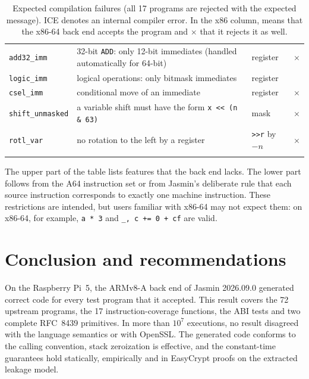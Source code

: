 \documentclass[11pt,a4paper]{article}
\newcommand{\yes}{\checkmark}
\newcommand{\no}{$\times$}
\newcommand{\ice}{ICE}
\begin{document}
\begin{longtable}{@{}p{2.9cm}p{8.1cm}p{2.4cm}c@{}}
\texttt{add32\_imm} & 32-bit \texttt{ADD}: only 12-bit immediates (handled automatically for 64-bit) & register & \no \\
\texttt{logic\_imm} & logical operations: only bitmask immediates & register & \yes \\
\texttt{csel\_imm} & conditional move of an immediate & register & \no \\
\texttt{shift\_unmasked} & a variable shift must have the form \texttt{x << (n \& 63)} & mask & \no \\
\texttt{rotl\_var} & no rotation to the left by a register & \texttt{>>r} by $-n$ & \no \\
\bottomrule
\caption{Expected compilation failures (all 17 programs are rejected with the
expected message). \ice{} denotes an internal compiler error. In the x86
column, \yes{} means that the x86-64 back end accepts the program and \no{}
that it rejects it as well.}
\end{longtable}

The upper part of the table lists features that the back end lacks. The
lower part follows from the A64 instruction set or from Jasmin's deliberate
rule that each source instruction corresponds to exactly one machine
instruction. These restrictions are intended, but users familiar with
x86-64 may not expect them: on x86-64, for example, \texttt{a * 3} and
\texttt{\_, c += 0 + cf} are valid.

\section{Conclusion and recommendations}

On the Raspberry Pi~5, the ARMv8-A back end of Jasmin 2026.09.0 generated
correct code for every test program that it accepted. This result covers the 72
upstream programs, the 17 instruction-coverage functions, the ABI tests and
two complete RFC~8439 primitives. In more than $10^7$ executions, no result
disagreed with the language semantics or with OpenSSL. The generated code
conforms to the calling convention, stack zeroization is effective, and the
constant-time guarantees hold statically, empirically and in EasyCrypt
proofs on the extracted leakage model.
\end{document}

